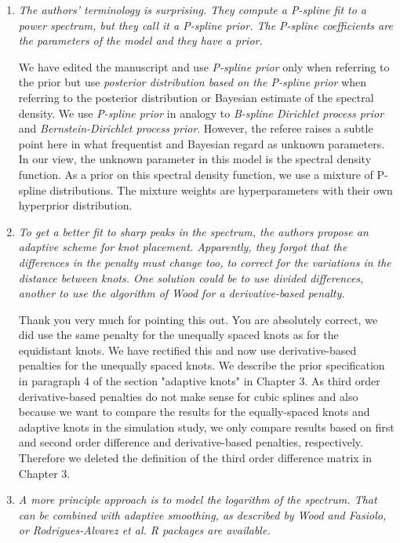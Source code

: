 \documentclass{scrartcl}
\newcommand{\refereeQuote}{\textit }
\newcommand{\response}{}
\begin{document}
\begin{enumerate}
\item
\refereeQuote{The authors' terminology is surprising. They compute a P-spline fit to a power spectrum, but they call it a P-spline prior. The P-spline coefficients are the parameters of the model and they have a prior.}\smallskip

\response{We have edited the manuscript and use {\em P-spline prior} only when referring to the prior but use {\em posterior distribution based on the P-spline prior} when referring to the posterior distribution or Bayesian estimate of the spectral density. We use {\em P-spline prior} in analogy to {\em B-spline Dirichlet process prior} and {\em Bernstein-Dirichlet process prior}.  However, the referee raises a subtle point here in what frequentist and Bayesian regard as unknown parameters. In our view, the unknown parameter in this model is the spectral density function. As a prior on this spectral density function, we use a mixture of P-spline distributions. The mixture weights are hyperparameters with their own hyperprior distribution.}\bigskip

\item
\refereeQuote{To get a better fit to sharp peaks in the spectrum, the authors propose an adaptive scheme for knot placement. Apparently, they forgot that the differences in the penalty must change too, to correct for the variations in the distance between knots. One solution could be to use divided differences, another to use the algorithm of Wood for a derivative-based penalty.}\smallskip

\response{Thank you very much for pointing this out. You are absolutely correct, we did use the same penalty for the unequally spaced knots as for the equidistant knots.
We have rectified this and now use derivative-based penalties for the unequally spaced knots. We describe the prior specification in paragraph 4  of the section  "adaptive knots" in Chapter 3. As third order derivative-based penalties do not make sense for cubic splines and also because we want to compare the results for the equally-spaced knots and adaptive knots in the simulation study, we only compare results based on first and second order difference and derivative-based penalties, respectively. Therefore we deleted the definition of the third order difference matrix in Chapter 3. }\bigskip

\item
\refereeQuote{A more principle approach is to model the logarithm of the spectrum. That can be combined with adaptive smoothing, as described by Wood and Fasiolo, or Rodrigues-Alvarez et al. R packages are available.}\smallskip


\end{enumerate}
\end{document}
